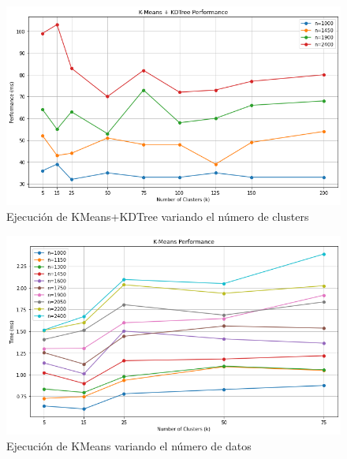 \documentclass[conference]{IEEEtran}
\begin{document}
\begin{figure}[htbp]
    \centering
    \includegraphics[width=1\linewidth]{figures/kmeanskdtree.png} %
    \caption{Ejecución de KMeans+KDTree variando el número de clusters}
    \label{fig:kmeanskdtree}
\end{figure}

\begin{figure}[htbp]
    \centering
    \includegraphics[width=1\linewidth]{figures/kmeans_six.png} %
    \caption{Ejecución de KMeans variando el número de datos}
    \label{fig:kmeans_six}
\end{figure}
\end{document}

